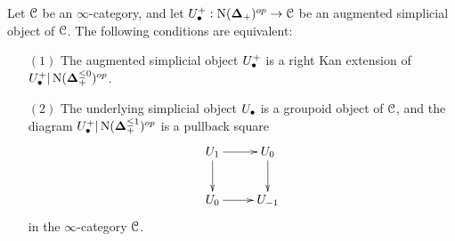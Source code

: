 \begin{proposition}\label{strump}
Let $\operatorname{\mathcal{C}}$ be an $\infty$-category, and let $U_{\bullet}^{+}: \operatorname{N}(\operatorname{{\bf \Delta}}_{+})^{op} \rightarrow \operatorname{\mathcal{C}}$ be an augmented simplicial object of $\operatorname{\mathcal{C}}$. The following conditions are equivalent:
\begin{itemize}
\item[$(1)$] The augmented simplicial object $U_{\bullet}^{+}$ is a right Kan extension
of $U_{\bullet}^{+}| \operatorname{N}(\operatorname{{\bf \Delta}}^{\leq 0}_{+})^{op}$.
\item[$(2)$] The underlying simplicial object $U_{\bullet}$ is a groupoid object of $\operatorname{\mathcal{C}}$, and the diagram $U_{\bullet}^{+} | \operatorname{N}( \operatorname{{\bf \Delta}}^{\leq 1}_{+})^{op}$ is a pullback square
$$ \xymatrix{ U_{1} \ar[r] \ar[d] & U_0 \ar[d] \\
U_{0} \ar[r] & U_{-1} }$$ 
in the $\infty$-category $\operatorname{\mathcal{C}}$.
\end{itemize}
\end{proposition}


